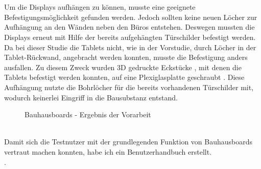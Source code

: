 \\
\\
Um die Displays aufhängen zu können, musste eine geeignete Befestigungsmöglichkeit gefunden werden.
Jedoch sollten keine neuen Löcher zur Aufhängung an den Wänden neben den Büros entstehen.
Deswegen mussten die Displays erneut mit Hilfe der bereits aufgehängten Türschilder befestigt werden.
Da bei dieser Studie die Tablets nicht, wie in der Vorstudie, durch Löcher in der Tablet-Rückwand, angebracht werden konnten, musste die Befestigung anders ausfallen.
Zu diesem Zweck wurden 3D gedruckte Eckstücke , mit denen die Tablets befestigt werden konnten, auf eine Plexiglasplatte geschraubt .
Diese Aufhängung nutzte die Bohrlöcher für die bereits vorhandenen Türschilder mit, wodurch keinerlei Eingriff in die Bausubstanz entstand.
\begin{figure}%
  \centering
  \caption{Bauhausboards - Ergebnis der Vorarbeit}
  \label{img:Vorarbeit}
\end{figure}
\\
Damit sich die Testnutzer mit der grundlegenden Funktion von Bauhausboards vertraut machen konnten, habe ich ein Benutzerhandbuch erstellt.
\\.

